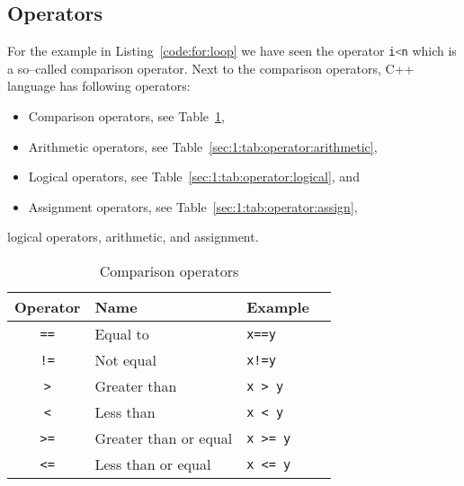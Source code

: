 


\subsection{Operators}
For the example in Listing~\ref{code:for:loop} we have seen the operator \lstinline[language=C++]|i<n| which is a so--called comparison operator. Next to the comparison operators, C++ language has following operators:
\begin{itemize}
\item Comparison operators, see Table~\ref{sec:1:tab:operator:comp},
\item Arithmetic operators, see Table~\ref{sec:1:tab:operator:arithmetic},
\item Logical operators, see Table~\ref{sec:1:tab:operator:logical}, and
\item Assignment operators, see Table~\ref{sec:1:tab:operator:assign},
\end{itemize}
 logical operators, arithmetic, and assignment.

\begin{table}[p]
\centering
\begin{tabular}{clll}
\toprule
Operator & Name  & Example \\ 
\midrule
\lstinline|==| & Equal to & \lstinline|x==y|\\ 
\lstinline|!=| & Not equal & \lstinline|x!=y|\\ 
\lstinline|>| & Greater than & \lstinline|x > y|\\ 
\lstinline|<| & Less than & \lstinline|x < y|\\ 
\lstinline|>=| & Greater than or equal & \lstinline|x >= y|\\ 
\lstinline|<=| & Less than or equal & \lstinline|x <= y|\\ 
\bottomrule 
\end{tabular} 
\caption{Comparison operators}
\label{sec:1:tab:operator:comp}
\end{table}

